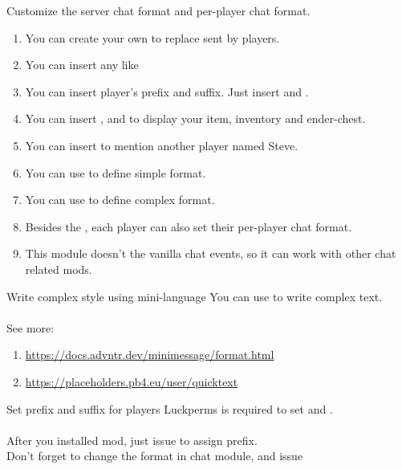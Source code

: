 Customize the server chat format and per-player chat format.


\begin{enumerate}
    \item You can create your own  to replace  sent by players.
    \item You can insert any  like 
    \item {You can insert player's prefix and suffix. Just insert  and .}
    \item You can insert ,  and  to display your item, inventory and ender-chest.
    \item You can insert  to mention another player named Steve.
    \item You can use  to define simple format.
    \item You can use  to define complex format.
    \item Besides the , each player can also set their per-player chat format.
    \item This module doesn't  the vanilla chat events, so it can work with other chat related mods.
\end{enumerate}

\begin{tips}{Write complex style using mini-language}
    You can use  to write complex text.\\
    \\
    See more:
    \begin{enumerate}
        \item \url{https://docs.advntr.dev/minimessage/format.html}
        \item \url{https://placeholders.pb4.eu/user/quicktext}
    \end{enumerate}
\end{tips}

\begin{note}{Set prefix and suffix for players}
    Luckperms is required to set  and . \\
    \\
    After you installed  mod, just issue  to assign prefix. \\
    Don't forget to change the format in chat module, and issue 
\end{note}

